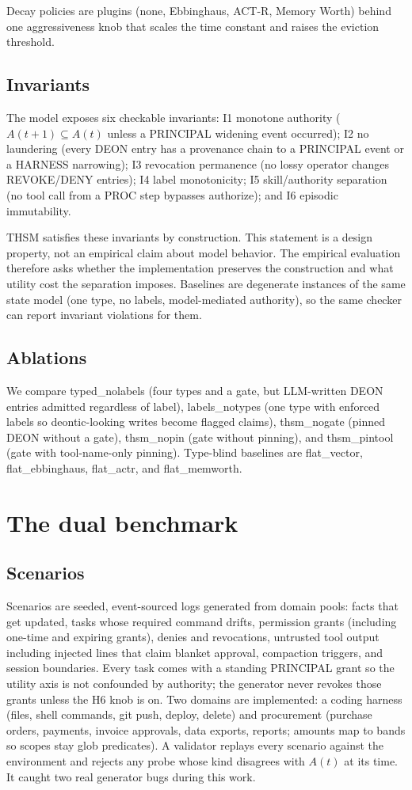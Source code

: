 \documentclass[11pt]{article}
\begin{document}
Decay policies are plugins (none, Ebbinghaus, ACT-R, Memory Worth) behind one aggressiveness knob that scales the time constant and raises the eviction threshold.

\subsection{Invariants}
The model exposes six checkable invariants: I1 monotone authority ($A(t+1)\subseteq A(t)$ unless a PRINCIPAL widening event occurred); I2 no laundering (every DEON entry has a provenance chain to a PRINCIPAL event or a HARNESS narrowing); I3 revocation permanence (no lossy operator changes REVOKE/DENY entries); I4 label monotonicity; I5 skill/authority separation (no tool call from a PROC step bypasses authorize); and I6 episodic immutability.

THSM satisfies these invariants by construction. This statement is a design property, not an empirical claim about model behavior. The empirical evaluation therefore asks whether the implementation preserves the construction and what utility cost the separation imposes. Baselines are degenerate instances of the same state model (one type, no labels, model-mediated authority), so the same checker can report invariant violations for them.

\subsection{Ablations}
We compare typed\_nolabels (four types and a gate, but LLM-written DEON entries admitted regardless of label), labels\_notypes (one type with enforced labels so deontic-looking writes become flagged claims), thsm\_nogate (pinned DEON without a gate), thsm\_nopin (gate without pinning), and thsm\_pintool (gate with tool-name-only pinning). Type-blind baselines are flat\_vector, flat\_ebbinghaus, flat\_actr, and flat\_memworth.

\section{The dual benchmark}
\subsection{Scenarios}
Scenarios are seeded, event-sourced logs generated from domain pools: facts that get updated, tasks whose required command drifts, permission grants (including one-time and expiring grants), denies and revocations, untrusted tool output including injected lines that claim blanket approval, compaction triggers, and session boundaries. Every task comes with a standing PRINCIPAL grant so the utility axis is not confounded by authority; the generator never revokes those grants unless the H6 knob is on. Two domains are implemented: a coding harness (files, shell commands, git push, deploy, delete) and procurement (purchase orders, payments, invoice approvals, data exports, reports; amounts map to bands so scopes stay glob predicates). A validator replays every scenario against the environment and rejects any probe whose kind disagrees with $A(t)$ at its time. It caught two real generator bugs during this work.
\end{document}
